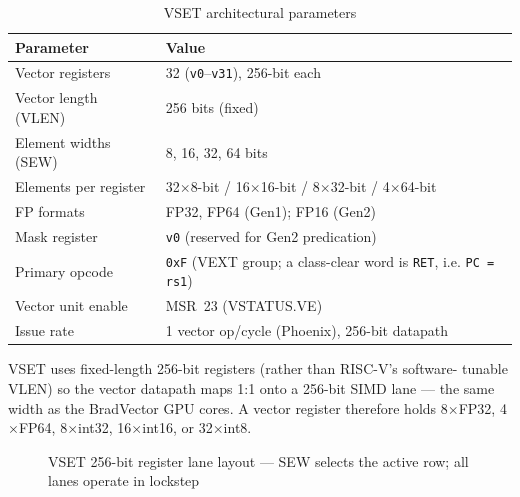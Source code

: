 \documentclass[11pt,a4paper]{article}
\begin{document}
\begin{table}[H]
\centering
\caption{VSET architectural parameters}
\begin{tabular}{ll}
\toprule
Parameter & Value \\
\midrule
Vector registers & 32 ({\tt v0}--{\tt v31}), 256-bit each \\
Vector length (VLEN) & 256 bits (fixed) \\
Element widths (SEW) & 8, 16, 32, 64 bits \\
Elements per register & 32$\times$8-bit / 16$\times$16-bit / 8$\times$32-bit / 4$\times$64-bit \\
FP formats & FP32, FP64 (Gen1); FP16 (Gen2) \\
Mask register & {\tt v0} (reserved for Gen2 predication) \\
Primary opcode & {\tt 0xF} (VEXT group; a class-clear word is {\tt RET}, i.e. {\tt PC = rs1}) \\
Vector unit enable & MSR~23 (VSTATUS.VE) \\
Issue rate & 1 vector op/cycle (Phoenix), 256-bit datapath \\
\bottomrule
\end{tabular}
\end{table}

VSET uses fixed-length 256-bit registers (rather than RISC-V's software-
tunable VLEN) so the vector datapath maps 1:1 onto a 256-bit SIMD lane ---
the same width as the BradVector GPU cores. A vector register therefore holds
8$\times$FP32, 4$\times$FP64, 8$\times$int32, 16$\times$int16, or
32$\times$int8.

\begin{figure}[H]
\centering
{}
\caption{VSET 256-bit register lane layout --- SEW selects the active row; all lanes operate in lockstep}
\end{figure}
\end{document}
